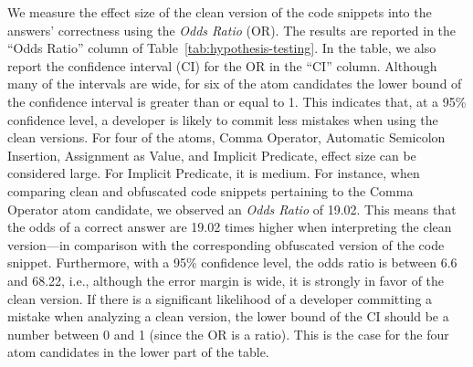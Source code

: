 We measure the effect size of the clean version of the code snippets into the answers' correctness using the \emph{Odds Ratio} (OR). The results are reported in the ``Odds Ratio'' column of Table~\ref{tab:hypothesis-testing}. 
In the table, we also report the confidence interval (CI) for the OR in the ``CI'' column. Although many of the intervals are wide, for six of the atom candidates the lower bound of the confidence interval is greater than or equal to 1. This indicates that, at a 95\% confidence level, a developer is likely to commit less mistakes when using the clean versions. 
For four of the atoms, Comma Operator, Automatic Semicolon Insertion, Assignment as Value, and Implicit Predicate, effect size can be considered large. For Implicit Predicate, it is medium. 
For instance, when comparing clean and obfuscated code snippets pertaining to the Comma Operator atom candidate, we observed an \emph{Odds Ratio} of \num{19.02}. This means that the odds of a correct answer are \num{19.02} times higher when interpreting the clean version---in comparison with the corresponding obfuscated version of the code snippet. Furthermore, with a 95\% confidence level, the odds ratio is between 6.6 and 68.22, i.e., although the error margin is wide, it is strongly in favor of the clean version. If there is a significant likelihood of a developer committing a mistake when analyzing a clean version, the lower bound of the CI should be a number between 0 and 1 (since the OR is a ratio). This is the case for the four atom candidates in the lower part of the table. 

